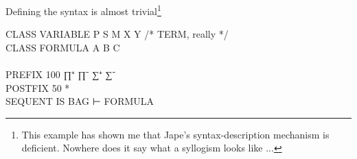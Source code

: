 Defining the syntax is almost trivial\footnote{This example has shown me that Jape's syntax-description mechanism is deficient. Nowhere does it say what a syllogism looks like ...}
\begin{japeish}
CLASS VARIABLE P S M X Y               /* TERM, really */\\
CLASS FORMULA A B C\\
\\
PREFIX 100 ∏⁺ ∏⁻ ∑⁺ ∑⁻\\
POSTFIX 50 *\\

SEQUENT IS BAG ⊢ FORMULA
\end{japeish}
\begin{figure}
\centering
{}
\end{figure}
